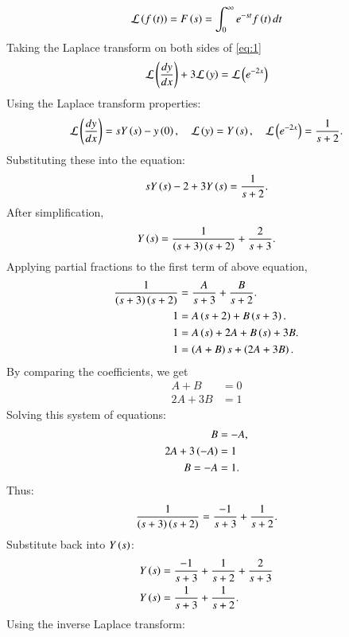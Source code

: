 \documentclass[journal,12pt,onecolumn]{IEEEtran}
\theoremstyle{remark}
\begin{document}
\begin{align}
    \mathcal{L}\left(f\left(t\right)\right) = F\left(s\right) = \int_{0}^{\infty} e^{-st} f\left(t\right)  dt
\end{align}
Taking the Laplace transform on both sides of \ref{eq:1}
\begin{align}
    \mathcal{L}\left(\frac{dy}{dx}\right) + 3\mathcal{L}\left(y\right) = \mathcal{L}\left(e^{-2x}\right)
\end{align}
Using the Laplace transform properties:
\begin{align}
    \mathcal{L}\left(\frac{dy}{dx}\right) = sY\left(s\right) - y\left(0\right), \quad \mathcal{L}\left(y\right) = Y\left(s\right), \quad \mathcal{L}\left(e^{-2x}\right) = \frac{1}{s + 2}.
\end{align}
Substituting these into the equation:
\begin{align}
sY\left(s\right) - 2 + 3Y\left(s\right) = \frac{1}{s + 2}.
\end{align}
After simplification,
\begin{align}
    Y\left(s\right) = \frac{1}{\left(s + 3\right)\left(s + 2\right)} + \frac{2}{s + 3}.
\end{align}
Applying partial fractions to the first term of above equation,
\begin{align}
\frac{1}{\left(s + 3\right)\left(s + 2\right)} &= \frac{A}{s + 3} + \frac{B}{s + 2}.\\
1 &= A\left(s + 2\right) + B\left(s + 3\right).\\
1 &= A\left(s\right) + 2A + B\left(s\right) + 3B.\\
1 &= \left(A + B\right)s + \left(2A + 3B\right).
\end{align}
By comparing the coefficients, we get
\begin{align}
A + B &= 0 \\
2A + 3B &= 1
\end{align}
Solving this system of equations:
\begin{align}
B &= -A, \\
2A + 3\left(-A\right) &= 1 \\ 
B = -A &= 1.
\end{align}
Thus:
\begin{align}
\frac{1}{\left(s + 3\right)\left(s + 2\right)} = \frac{-1}{s + 3} + \frac{1}{s + 2}.
\end{align}
Substitute back into $ Y\left(s\right) $:
\begin{align}
    Y\left(s\right) &= \frac{-1}{s + 3} + \frac{1}{s + 2} + \frac{2}{s + 3}\\
    Y\left(s\right) &= \frac{1}{s + 3} + \frac{1}{s + 2}.
\end{align}
Using the inverse Laplace transform:
\end{document}
